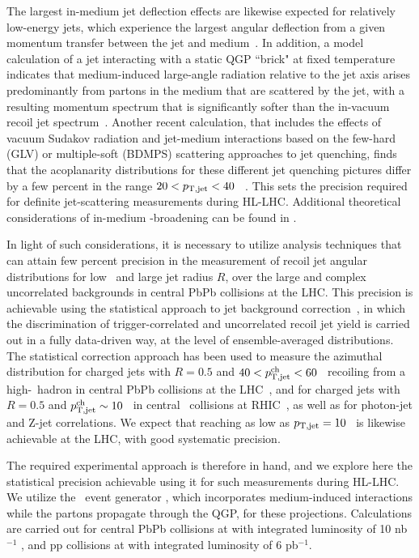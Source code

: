 The largest in-medium jet deflection effects are likewise expected for relatively low-energy jets, which experience the largest angular deflection from a given momentum transfer between the jet and medium~\cite{DEramo:2018eoy,Gyulassy:2018qhr}. In addition, a model calculation of a jet interacting with a static QGP ``brick" at fixed temperature indicates that medium-induced large-angle radiation relative to the jet axis arises predominantly from partons in the medium that are scattered by the jet, with a resulting momentum spectrum that is significantly softer than the in-vacuum recoil jet spectrum~\cite{DEramo:2018eoy}. Another recent calculation, that includes the effects of vacuum Sudakov radiation and jet-medium interactions based on the few-hard (GLV) or multiple-soft (BDMPS) scattering approaches to jet quenching, finds that the acoplanarity distributions for these different jet quenching pictures differ by a few percent in the range $20<p_{\mathrm{T,jet}}<40$ \gevc~\cite{Gyulassy:2018qhr}. This sets the precision required for definite jet-scattering measurements during HL-LHC. Additional theoretical considerations of in-medium \pT-broadening can be found in \cite{Zakharov:2018rst,Ghiglieri:2018ltw}.

In light of such considerations, it is necessary to utilize analysis techniques that can attain few percent precision in the measurement of recoil jet angular distributions for low \ptjet\ and large jet radius $R$, over the large and complex uncorrelated backgrounds in central PbPb collisions at the LHC. This precision is achievable using the statistical approach to jet background correction~\cite{Adam:2015doa,Adamczyk:2017yhe,Sirunyan:2017jic,Sirunyan:2017qhf}, in which the discrimination of trigger-correlated and uncorrelated recoil jet yield is carried out in a fully data-driven way, at the level of ensemble-averaged distributions. The statistical correction approach has been used to measure the azimuthal distribution for charged jets with $R=0.5$ and $40<p_{\mathrm{T,jet}}^{\mathrm{ch}}<60$ \gevc\ recoiling from a high-\pt\ hadron in central PbPb collisions at the LHC~\cite{Adam:2015doa}, and for charged jets with $R=0.5$ and $p_{\mathrm{T,jet}}^{\mathrm{ch}}\sim10$ \gevc\ in central \AuAu\ collisions at RHIC~\cite{Adamczyk:2017yhe}, as well as for photon-jet and Z-jet correlations. We expect that reaching as low as $p_{\mathrm{T,jet}}=10$ \gevc\ is likewise achievable at the LHC, with good systematic precision. 

The required experimental approach is therefore in hand, and we explore here the statistical precision achievable using it for such measurements during HL-LHC. 
We utilize the \jewel\ event generator \cite{Zapp:2013vla}, which incorporates medium-induced interactions while the partons propagate through the QGP, for these projections. Calculations are carried out for central PbPb collisions at  with integrated luminosity of 10 nb$^{-1}$ , and pp collisions at  with integrated luminosity of 6 pb$^{-1}$. 

